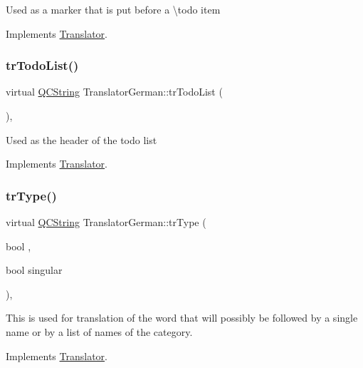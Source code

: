 Used as a marker that is put before a \textbackslash{}todo item 

Implements \mbox{\hyperlink{class_translator}{Translator}}.

\mbox{\label{class_translator_german_a36ed42b61b80a138183c6c6569567f64}} 
\subsubsection{\texorpdfstring{trTodoList()}{trTodoList()}}
{\footnotesize\ttfamily virtual \mbox{\hyperlink{class_q_c_string}{Q\+C\+String}} Translator\+German\+::tr\+Todo\+List (\begin{DoxyParamCaption}{ }\end{DoxyParamCaption})\hspace{0.3cm}{\ttfamily [inline]}, {\ttfamily [virtual]}}

Used as the header of the todo list 

Implements \mbox{\hyperlink{class_translator}{Translator}}.

\mbox{\label{class_translator_german_a3d30f2857eaf842e87b2f5e97f0f8aa2}} 
\subsubsection{\texorpdfstring{trType()}{trType()}}
{\footnotesize\ttfamily virtual \mbox{\hyperlink{class_q_c_string}{Q\+C\+String}} Translator\+German\+::tr\+Type (\begin{DoxyParamCaption}\item[{bool}]{,  }\item[{bool}]{singular }\end{DoxyParamCaption})\hspace{0.3cm}{\ttfamily [inline]}, {\ttfamily [virtual]}}

This is used for translation of the word that will possibly be followed by a single name or by a list of names of the category. 

Implements \mbox{\hyperlink{class_translator}{Translator}}.

\mbox{\label{class_translator_german_a75377d22864cfad0cfaaa88047196ab0}} 
